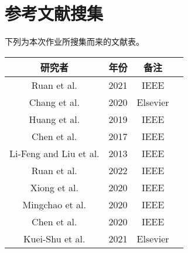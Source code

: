 \chapter{参考文献搜集}

下列为本次作业所搜集而来的文献表。




\begin{center}
\begin{tabular}{cccc}
\hline
研究者 & 年份 & 备注 \\
\hline
Ruan et al. \cite{ruan2021enhanced} & 2021 & IEEE \\
Chang et al. \cite{chang2020low} & 2020 & Elsevier \\
Huang et al. \cite{huang2019high} & 2019 & IEEE \\
Chen et al. \cite{chen2017super} & 2017 & IEEE \\
Li-Feng and Liu et al. \cite{teng2013electrical} & 2013 & IEEE \\
Ruan et al. \cite{ruan2022performance} & 2022 & IEEE \\
Xiong et al. \cite{xiong2020investigation} & 2020 & IEEE \\
Mingchao et al. \cite{liu2020three} & 2020 & IEEE \\
Chen et al. \cite{chen2020advanced} & 2020 & IEEE \\
Kuei-Shu et al. \cite{ruan2021enhanced} & 2021 & Elsevier \\
\hline
\end{tabular}
\end{center}


